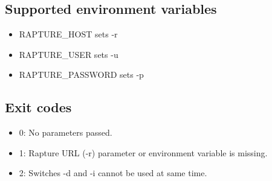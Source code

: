 \subsection{Supported environment variables}
\begin{itemize}
\item{RAPTURE\_HOST sets -r}
\item{RAPTURE\_USER sets -u}
\item{RAPTURE\_PASSWORD sets -p}
\end{itemize}

\subsection{Exit codes}
\begin{itemize}
\item{0: No parameters passed.}
\item{1: Rapture URL (-r) parameter or environment variable is missing.}
\item{2: Switches -d and -i cannot be used at same time.}
\end{itemize}
